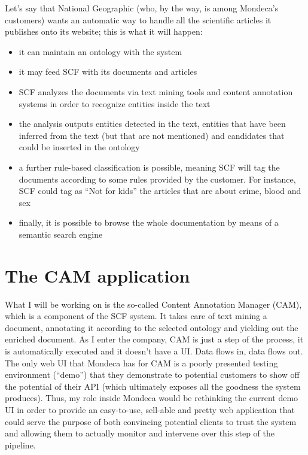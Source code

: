 \documentclass[12pt,svgnames]{memoir}
\begin{document}
Let's say that National Geographic (who, by the way, is among Mondeca's
customers) wants an automatic way to handle all the scientific articles
it publishes onto its website; this is what it will happen:

\begin{itemize}
\itemsep1pt\parskip0pt
\item
  it can maintain an ontology with the system
\item
  it may feed SCF with its documents and articles
\item
  SCF analyzes the documents via text mining tools and content
  annotation systems in order to recognize entities inside the text
\item
  the analysis outputs entities detected in the text, entities that have
  been inferred from the text (but that are not mentioned) and
  candidates that could be inserted in the ontology
\item
  a further rule-based classification is possible, meaning SCF will tag
  the documents according to some rules provided by the customer. For
  instance, SCF could tag as ``Not for kids'' the articles that are
  about crime, blood and sex
\item
  finally, it is possible to browse the whole documentation by means of
  a semantic search engine
\end{itemize}

\section{The CAM application}\label{the-cam-application}

What I will be working on is the so-called Content Annotation Manager
(CAM), which is a component of the SCF system. It takes care of text
mining a document, annotating it according to the selected ontology and
yielding out the enriched document. As I enter the company, CAM is just
a step of the process, it is automatically executed and it doesn't have
a UI. Data flows in, data flows out. The only web UI that Mondeca has
for CAM is a poorly presented testing environment (``demo'') that they
demonstrate to potential customers to show off the potential of their
API (which ultimately exposes all the goodness the system produces).
Thus, my role inside Mondeca would be rethinking the current demo UI in
order to provide an easy-to-use, sell-able and pretty web application
that could serve the purpose of both convincing potential clients to
trust the system and allowing them to actually monitor and intervene
over this step of the pipeline.
\end{document}
